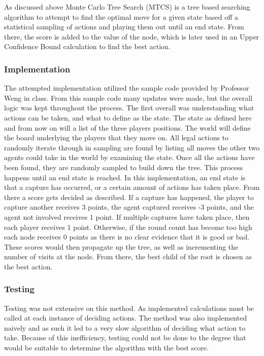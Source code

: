 \documentclass[letterpaper, 10 pt, conference]{ieeeconf}   %
\begin{document}
As discussed above Monte Carlo Tree Search (MTCS) is a tree based searching algorithm to attempt to find the optimal
move for a given state based off a statistical sampling of actions and playing them out until an end state.
From there, the score is added to the value of the node, which is later used in an Upper Confidence Bound calculation to find the best
action.

\subsubsection{Implementation}
The attempted implementation utilized the sample code provided by Professor Weng in class. From this sample code many updates were made,
but the overall logic was kept throughout the process. The first overall was understanding what actions can be taken, and what to define as the state.
The state as defined here and from now on will a list of the three players positions. The world will define the board underlying the players that they move on.
All legal actions to randomly iterate through in sampling are found by listing all moves the other two agents could take in the world by examining the state. Once
all the actions have been found, they are randomly sampled to build down the tree. This process happens until an end state is reached.
In this implementation, an end state is that a capture has occurred, or a certain amount of actions has taken place. From there a score gets decided as described.
If a capture has happened, the player to capture another receives 3 points, the agent captured receives -3 points, and the agent not involved receives 1 point.
If multiple captures have taken place, then each player receives 1 point.
Otherwise, if the round count has become too high each node receives 0 points as there is no clear evidence that it is good or bad.
These scores would then propagate up the tree, as well as incrementing the number of visits at the node. From there, the best child of the root
is chosen as the best action.

\subsubsection{Testing}
Testing was not extensive on this method. As implemented calculations must be called
at each instance of deciding actions. The method was also implemented naively and as such
it led to a very slow algorithm of deciding what action to take. Because of this inefficiency, testing could
not be done to the degree that would be suitable to determine the algorithm with the best score.
\end{document}
